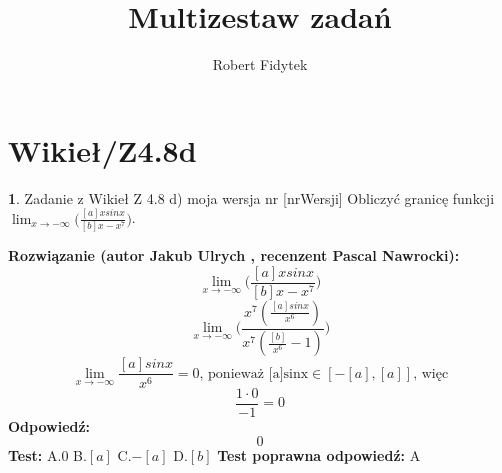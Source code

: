 \documentclass[12pt, a4paper]{article}
\title{Multizestaw zadań}
\author{Robert Fidytek}
\date{}
\theoremstyle{definition} %
\newtheorem{zad}{}
\newcommand{\kategoria}[1]{\section{#1}} %
\newcommand{\zadStart}[1]{\begin{zad}#1\newline} %
\newcommand{\zadStop}{\end{zad}}   %
\newcommand{\rozwStart}[2]{\noindent \textbf{Rozwiązanie (autor #1 , recenzent #2): }\newline} %
\newcommand{\rozwStop}{\newline}                                            %
\newcommand{\odpStart}{\noindent \textbf{Odpowiedź:}\newline}    %
\newcommand{\odpStop}{\newline}                                             %
\newcommand{\testStart}{\noindent \textbf{Test:}\newline} %
\newcommand{\testStop}{\newline} %
\newcommand{\kluczStart}{\noindent \textbf{Test poprawna odpowiedź:}\newline} %
\newcommand{\kluczStop}{\newline} %
\begin{document}
\maketitle


\kategoria{Wikieł/Z4.8d}
\zadStart{Zadanie z Wikieł Z 4.8 d) moja wersja nr [nrWersji]}
Obliczyć granicę funkcji $\lim_{x \to -\infty}\bigg(\frac{[a]xsinx}{[b]x-x^{7}}\bigg)$.
\zadStop
\rozwStart{Jakub Ulrych}{Pascal Nawrocki}
$$\lim_{x \to -\infty}\bigg(\frac{[a]xsinx}{[b]x-x^{7}}\bigg)$$
$$\lim_{x \to -\infty}\bigg(\frac{x^{7}(\frac{[a]sinx}{x^{6}})}{x^{7}(\frac{[b]}{x^{6}}-1)}\bigg)$$
$$\lim_{x \to -\infty}\frac{[a]sinx}{x^{6}}=0\text{, ponieważ [a]sinx}\in[-[a],[a]]\text{, więc}$$
$$\frac{1\cdot0}{-1}=0$$
\rozwStop
\odpStart
$$0$$
\odpStop
\testStart
A.$0$
B.$[a]$
C.$-[a]$
D.$[b]$
\testStop
\kluczStart
A
\kluczStop
\end{document}
